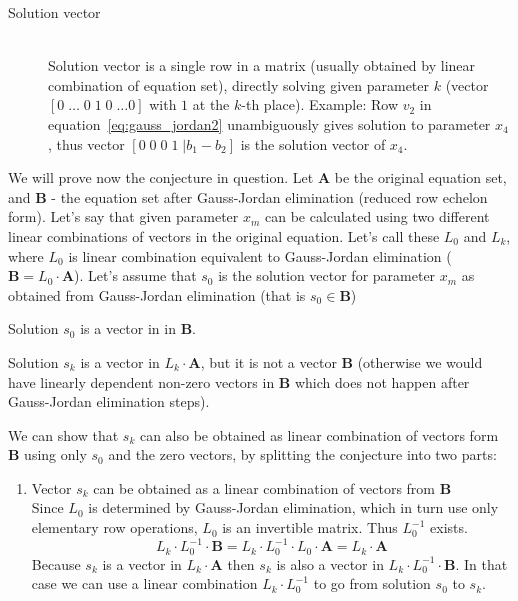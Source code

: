 \begin{description}
\begin{description}
        \item[Solution vector] \hfill \\
            Solution vector is a single row in a matrix (usually obtained by linear combination of equation set), directly solving given parameter $k$ (vector $[0 \;\ldots\;0\;1\;0\; \ldots 0 ]$ with $1$ at the $k$-th place).
            Example:
            Row $v_2$ in equation~\ref{eq:gauss_jordan2} unambiguously gives solution to parameter $x_4$, thus vector $[0\;0\;0\;1\;|b_1 - b_2]$ is the solution vector of $x_4$.
    \end{description}

    We will prove now the conjecture in question. 
    Let $\boldsymbol{A}$ be the original equation set, and $\boldsymbol{B}$ - the equation set after Gauss-Jordan elimination (reduced row echelon form).
    Let's say that given parameter $x_m$ can be calculated using two different linear combinations of vectors in the original equation.
    Let's call these $L_0$ and $L_k$, where $L_0$ is linear combination equivalent to Gauss-Jordan elimination ($\boldsymbol{B} = L_0 \cdot \boldsymbol{A}$).
    Let's assume that $s_0$ is the solution vector for parameter $x_m$ as obtained from Gauss-Jordan elimination (that is $s_0 \in \boldsymbol{B}$)

    Solution $s_0$ is a vector in in $\boldsymbol{B}$.

    Solution $s_k$ is a vector in $L_k \cdot \boldsymbol{A}$, but it is not a vector $\boldsymbol{B}$ (otherwise we would have linearly dependent non-zero vectors in $\boldsymbol{B}$ which does not happen after Gauss-Jordan elimination steps).

    We can show that $s_k$ can also be obtained as linear combination of vectors form $\boldsymbol{B}$ using only $s_0$ and the zero vectors, by splitting the conjecture into two parts:
    \begin{enumerate}
    \item Vector $s_k$ can be obtained as a linear combination of vectors from $\boldsymbol{B}$ \hfill \\
        Since $L_0$ is determined by Gauss-Jordan elimination, which in turn use only elementary row operations, $L_0$ is an invertible matrix.
        Thus $L_0^{-1}$ exists.
        \begin{equation}
            L_k \cdot L_0^{-1} \cdot \boldsymbol{B} = L_k \cdot L_0^{-1} \cdot L_0 \cdot \boldsymbol{A} = L_k \cdot \boldsymbol{A}
        \end{equation}
        Because $s_k$ is a vector in $L_k \cdot \boldsymbol{A}$ then $s_k$ is also a vector in $L_k \cdot L_0^{-1} \cdot \boldsymbol{B}$.
        In that case we can use a linear combination $L_k \cdot L_0^{-1}$ to go from solution $s_0$ to $s_k$.


\end{enumerate}
\end{description}

